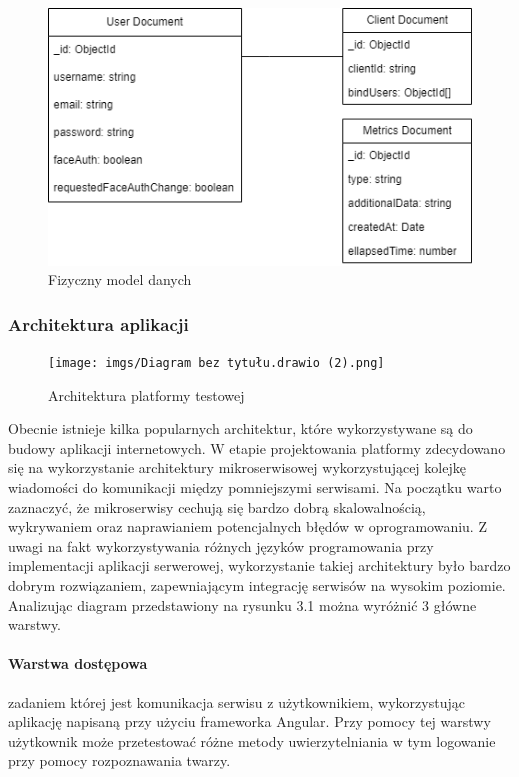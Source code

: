 \begin{figure}[ht]
	\centering
		\includegraphics[width=0.5\linewidth]{imgs/db-model.png}
	\caption{Fizyczny model danych}
	\label{fig:model-danych}
\end{figure}
\subsubsection{Architektura aplikacji}
\begin{figure}[ht]
	\centering
		\texttt{[image: imgs/Diagram bez tytułu.drawio (2).png]}
	\caption{Architektura platformy testowej}
	\label{fig:architektura-aplikacji}
\end{figure}

Obecnie istnieje kilka popularnych architektur, które wykorzystywane są do budowy aplikacji internetowych. W etapie projektowania platformy zdecydowano się na wykorzystanie architektury mikroserwisowej wykorzystującej kolejkę wiadomości do komunikacji między pomniejszymi serwisami. Na początku warto zaznaczyć, że mikroserwisy cechują się bardzo dobrą skalowalnością, wykrywaniem oraz naprawianiem potencjalnych błędów w oprogramowaniu. Z uwagi na fakt wykorzystywania różnych języków programowania przy implementacji aplikacji serwerowej, wykorzystanie takiej architektury było bardzo dobrym rozwiązaniem, zapewniającym integrację serwisów na wysokim poziomie.
Analizując diagram przedstawiony na rysunku 3.1 można wyróżnić 3 główne warstwy.

\paragraph{Warstwa dostępowa} zadaniem której jest komunikacja serwisu z użytkownikiem, wykorzystując aplikację napisaną przy użyciu frameworka Angular. Przy pomocy tej warstwy użytkownik może przetestować różne metody uwierzytelniania w tym logowanie przy pomocy rozpoznawania twarzy.


